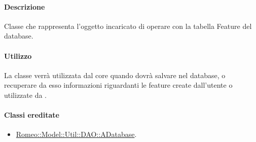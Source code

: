 \paragraph{Descrizione \\}
Classe che rappresenta l'oggetto incaricato di operare con la tabella Feature\g{} del database.

\paragraph{Utilizzo\\}
La classe verrà utilizzata dal core quando dovrà salvare nel database, o recuperare da esso informazioni riguardanti le feature\g{} create dall'utente o utilizzate da \project.

\paragraph{Classi ereditate\\}
	\begin{itemize}
	\item \hyperref[speadatabase]{Romeo::Model::Util::DAO::ADatabase}.
	\end{itemize}
	
